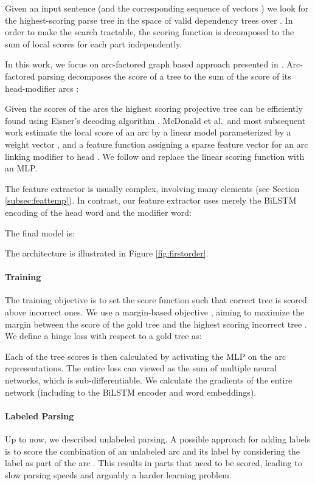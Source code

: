 \documentclass[11pt]{article}
\begin{document}
\noindent Given an input sentence  (and the corresponding sequence of vectors
) we look for the highest-scoring parse tree  in the space
 of valid dependency trees over . In order to make the search tractable, 
the scoring function is decomposed to the sum of local scores for each part independently. 

In this work, we focus on arc-factored graph based approach presented in .
Arc-factored parsing decomposes the score of a tree to the sum of the score of its
head-modifier arcs :

Given the scores of the arcs the highest scoring projective tree can be
efficiently found using Eisner's decoding algorithm .
McDonald et al.\ and most subsequent work estimate the local score of an arc by a
linear model parameterized by a weight vector , and a feature function  assigning a sparse
feature vector for an arc linking modifier  to head . We follow  and replace the linear scoring function with an
MLP.

The feature extractor  is usually complex, involving many elements (see  Section \ref{subsec:feattemp}).
In contrast, our feature extractor uses merely the \mbox{BiLSTM} encoding of the head word and the
modifier word:


\noindent The final model is:

\noindent The architecture is illustrated in Figure \ref{fig:firstorder}.

\paragraph{Training} The training objective is to set the score function such that correct tree  is scored
above incorrect ones. We use a margin-based objective
\cite{mst,lecun2006tutorial}, 
aiming to maximize the margin between the score of the gold tree  and the highest scoring incorrect
tree . We define a hinge loss with respect to a gold tree  as:


\noindent Each of the tree scores is then calculated by activating the MLP on the arc
representations. The entire loss can viewed as the sum of multiple neural
networks, which is sub-differentiable. We calculate the gradients of the entire
network (including to the \mbox{BiLSTM} encoder and word embeddings).

\paragraph{Labeled Parsing}
Up to now, we described unlabeled parsing. 
A possible approach for adding labels is to score the combination of an
unlabeled arc  and its label  by considering the label as part of the arc .
This results in  parts that need to be scored, leading
to slow parsing speeds and arguably a harder learning problem.
\end{document}
